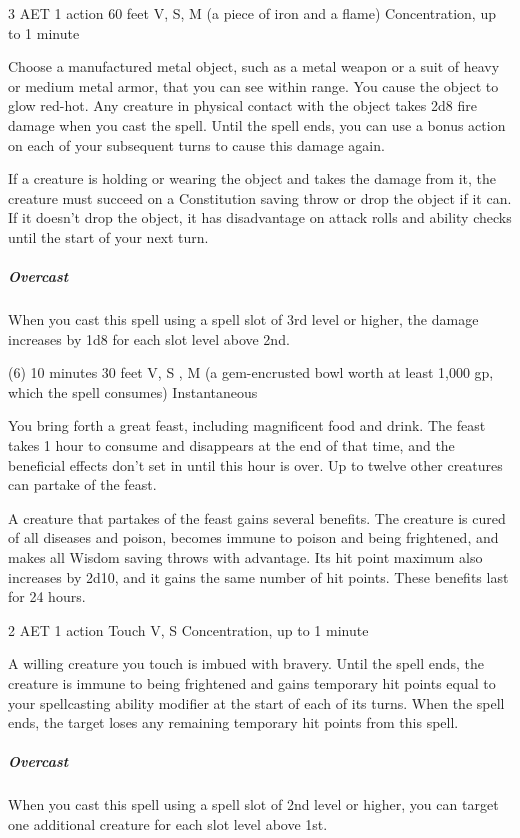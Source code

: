 \label{spell:heat-metal}
{3 AET}
{1 action}
{60 feet}
{V, S, M (a piece of iron and a flame)}
{Concentration, up to 1 minute}

Choose a manufactured metal object, such as a metal weapon or a suit of heavy or medium metal armor, that you can see within range. You cause the object to glow red-hot. Any creature in physical contact with the object takes 2d8 fire damage when you cast the spell. Until the spell ends, you can use a bonus action on each of your subsequent turns to cause this damage again.

If a creature is holding or wearing the object and takes the damage from it, the creature must succeed on a Constitution saving throw or drop the object if it can. If it doesn't drop the object, it has disadvantage on attack rolls and ability checks until the start of your next turn.
\subparagraph*{Overcast} When you cast this spell using a spell slot of 3rd level or higher, the damage increases by 1d8 for each slot level above 2nd.

\label{spell:heroes-feast}
{(6)}
{10 minutes}
{30 feet}
{V, S , M (a gem-encrusted bowl worth at least 1,000 gp, which the spell consumes)}
{Instantaneous}

You bring forth a great feast, including magnificent food and drink. The feast takes 1 hour to consume and disappears at the end of that time, and the beneficial effects don't set in until this hour is over. Up to twelve other creatures can partake of the feast.

A creature that partakes of the feast gains several benefits. The creature is cured of all diseases and poison, becomes immune to poison and being frightened, and makes all Wisdom saving throws with advantage. Its hit point maximum also increases by 2d10, and it gains the same number of hit points. These benefits last for 24 hours.

\label{spell:heroism}
{2 AET}
{1 action}
{Touch}
{V, S}
{Concentration, up to 1 minute}

A willing creature you touch is imbued with bravery. Until the spell ends, the creature is immune to being frightened and gains temporary hit points equal to your spellcasting ability modifier at the start of each of its turns. When the spell ends, the target loses any remaining temporary hit points from this spell.
\subparagraph*{Overcast} When you cast this spell using a spell slot of 2nd level or higher, you can target one additional creature for each slot level above 1st.

